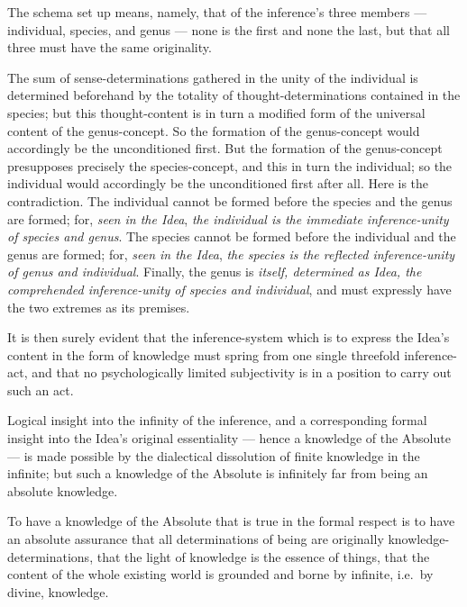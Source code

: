 \documentclass[12pt]{book}
\begin{document}
The schema set up means, namely, that of the inference's three
members --- individual, species, and genus --- none is the first and
none the last, but that all three must have the same originality.

The sum of sense-determinations gathered in the unity of the
individual is determined beforehand by the totality of
thought-determinations contained in the species; but this
thought-content is in turn a modified form of the universal content
of the genus-concept. So the formation of the genus-concept would
accordingly be the unconditioned first. But the formation of the
genus-concept presupposes precisely the species-concept, and this in
turn the individual; so the individual would accordingly be the
unconditioned first after all. Here is the contradiction. The
individual cannot be formed before the species and the genus are
formed; for, \emph{seen in the Idea}, \emph{the individual is the
immediate inference-unity of species and genus}. The species cannot
be formed before the individual and the genus are formed; for,
\emph{seen in the Idea}, \emph{the species is the
reflected inference-unity of genus and individual}. Finally, the
genus is \emph{itself, determined as Idea, the comprehended
inference-unity of species and individual}, and must expressly have
the two extremes as its premises.

It is then surely evident that the inference-system which is to
express the Idea's content in the form of knowledge must spring from
one single threefold inference-act, and that no psychologically
limited subjectivity is in a position to carry out such an act.

Logical insight into the infinity of the inference, and a
corresponding formal insight into the Idea's original essentiality
--- hence a knowledge of the Absolute --- is made possible by the
dialectical dissolution of finite knowledge in the infinite; but
such a knowledge of the Absolute is infinitely far from being an
absolute knowledge.

To have a knowledge of the Absolute that is true in the formal
respect is to have an absolute assurance that all determinations of
being are originally knowledge-determinations, that the light of
knowledge is the essence of things, that the content of the whole
existing world is grounded and borne by infinite, i.e.\ by divine,
knowledge.
\end{document}
